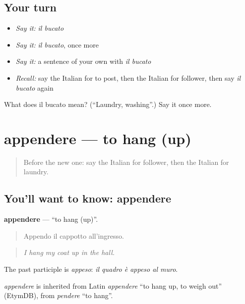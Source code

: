 \subsection*{Your turn}
\begin{itemize}
\raggedright
  \item \emph{Say it:} \emph{il bucato}
  \item \emph{Say it:} \emph{il bucato}, once more
  \item \emph{Say it:} a sentence of your own with \emph{il bucato}
  \item \emph{Recall:} say the Italian for to post, then the Italian for follower, then say \emph{il bucato} again
\end{itemize}

\begin{tcolorbox}[breakable,colback=teal!4,colframe=teal!35!black,title={Before you move on}]
What does il bucato mean? (\textquotedblleft{}Laundry, washing\textquotedblright{}.) Say it once more.
\end{tcolorbox}
\section[appendere]{appendere — to hang (up)}

\label{lesson:IT-C531-appendere}



\begin{quote}
Before the new one: say the Italian for follower, then the Italian for laundry.
\end{quote}

\subsection*{You'll want to know: appendere}
\textbf{appendere} — \textquotedblleft{}to hang (up)\textquotedblright{}.

\begin{quote}
Appendo il cappotto all'ingresso.
\end{quote}

\begin{quote}
\emph{I hang my coat up in the hall.}
\end{quote}

The past participle is \emph{appeso}: \emph{il quadro è appeso al muro}.

\begin{cousinweb}
\emph{appendere} is inherited from Latin \emph{appendere} \textquotedblleft{}to hang up, to weigh out\textquotedblright{} (EtymDB), from \emph{pendere} \textquotedblleft{}to hang\textquotedblright{}.
\end{cousinweb}

